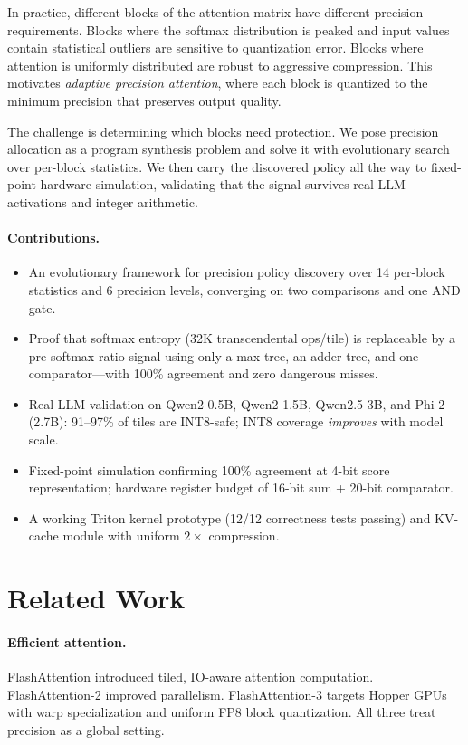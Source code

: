 \documentclass[10pt,twocolumn]{article}
\begin{document}
In practice, different blocks of the attention matrix have different
precision requirements. Blocks where the softmax distribution is peaked
and input values contain statistical outliers are sensitive to
quantization error. Blocks where attention is uniformly distributed are
robust to aggressive compression. This motivates \emph{adaptive precision
attention}, where each block is quantized to the minimum precision that
preserves output quality.

The challenge is determining which blocks need protection. We pose
precision allocation as a program synthesis problem and solve it with
evolutionary search over per-block statistics. We then carry the
discovered policy all the way to fixed-point hardware simulation,
validating that the signal survives real LLM activations and integer
arithmetic.

\paragraph{Contributions.}
\begin{itemize}
  \item An evolutionary framework for precision policy discovery over 14
  per-block statistics and 6 precision levels, converging on two
  comparisons and one AND gate.
  \item Proof that softmax entropy (32K transcendental ops/tile) is
  replaceable by a pre-softmax ratio signal using only a max tree, an
  adder tree, and one comparator---with 100\% agreement and zero
  dangerous misses.
  \item Real LLM validation on Qwen2-0.5B, Qwen2-1.5B, Qwen2.5-3B, and Phi-2 (2.7B):
  91--97\% of tiles are INT8-safe; INT8 coverage \emph{improves} with
  model scale.
  \item Fixed-point simulation confirming 100\% agreement at 4-bit score
  representation; hardware register budget of 16-bit sum + 20-bit
  comparator.
  \item A working Triton kernel prototype (12/12 correctness tests
  passing) and KV-cache module with uniform $2\times$ compression.
\end{itemize}

\section{Related Work}

\paragraph{Efficient attention.}
FlashAttention \citep{dao2022flashattention} introduced tiled, IO-aware
attention computation. FlashAttention-2 \citep{dao2023flashattention2}
improved parallelism. FlashAttention-3 \citep{shah2024flashattention3}
targets Hopper GPUs with warp specialization and uniform FP8 block
quantization. All three treat precision as a global setting.
\end{document}
